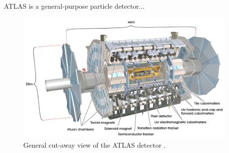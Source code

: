 ﻿ATLAS is a general-purpose particle detector...

\begin{figure}[tbp]
  \begin{center}
    \includegraphics[width=0.98\textwidth]{figs/detector/atlas.pdf}
  \end{center}
  \caption[General cut-away view of the ATLAS detector.]
          {General cut-away view of the ATLAS detector \cite{PERF-2007-01}.}
\end{figure}
